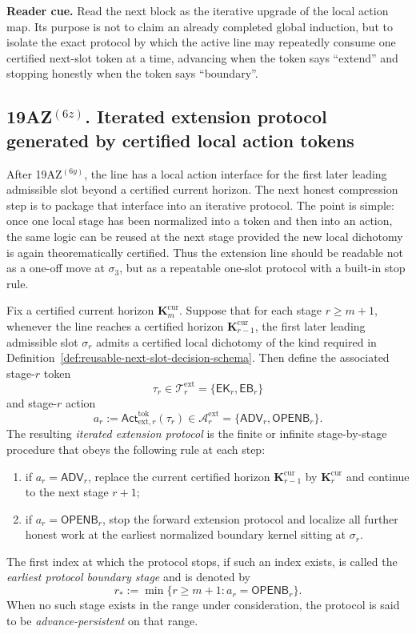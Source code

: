 \noindent\textbf{Reader cue.} Read the next block as the iterative upgrade of the local action map. Its purpose is not to claim an already completed global induction, but to isolate the exact protocol by which the active line may repeatedly consume one certified next-slot token at a time, advancing when the token says ``extend'' and stopping honestly when the token says ``boundary''.

\subsection*{19AZ$^{(6z)}$. Iterated extension protocol generated by certified local action tokens}
\label{sec:iterated-extension-protocol-generated-by-certified-local-action-tokens}
After 19AZ$^{(6y)}$, the line has a local action interface for the first later leading admissible slot beyond a certified current horizon. The next honest compression step is to package that interface into an iterative protocol. The point is simple: once one local stage has been normalized into a token and then into an action, the same logic can be reused at the next stage provided the new local dichotomy is again theorematically certified. Thus the extension line should be readable not as a one-off move at $\sigma_3$, but as a repeatable one-slot protocol with a built-in stop rule.

\begin{definition}
\label{def:iterated-extension-protocol-with-earliest-boundary-stop-rule}
Fix a certified current horizon $\mathbf K_m^{\mathrm{cur}}$. Suppose that for each stage $r\geq m+1$, whenever the line reaches a certified horizon $\mathbf K_{r-1}^{\mathrm{cur}}$, the first later leading admissible slot $\sigma_r$ admits a certified local dichotomy of the kind required in Definition~\ref{def:reusable-next-slot-decision-schema}. Then define the associated stage-$r$ token
\[
  \tau_r \in \mathcal T^{\mathrm{ext}}_r = \{\mathsf{EK}_r,\mathsf{EB}_r\}
\]
and stage-$r$ action
\[
  a_r := \mathsf{Act}^{\mathrm{tok}}_{\mathrm{ext},r}(\tau_r)
  \in \mathcal A^{\mathrm{ext}}_r = \{\mathsf{ADV}_r,\mathsf{OPENB}_r\}.
\]
The resulting \emph{iterated extension protocol} is the finite or infinite stage-by-stage procedure that obeys the following rule at each step:
\begin{enumerate}[label=(\roman*)]
  \item if $a_r=\mathsf{ADV}_r$, replace the current certified horizon $\mathbf K_{r-1}^{\mathrm{cur}}$ by $\mathbf K_r^{\mathrm{cur}}$ and continue to the next stage $r+1$;
  \item if $a_r=\mathsf{OPENB}_r$, stop the forward extension protocol and localize all further honest work at the earliest normalized boundary kernel sitting at $\sigma_r$.
\end{enumerate}
The first index at which the protocol stops, if such an index exists, is called the \emph{earliest protocol boundary stage} and is denoted by
\[
  r_* := \min\{r\ge m+1 : a_r=\mathsf{OPENB}_r\}.
\]
When no such stage exists in the range under consideration, the protocol is said to be \emph{advance-persistent} on that range.
\end{definition}

